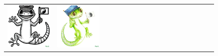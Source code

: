 \begin{figure}[ht!]
\begin{adjustwidth}{-0.8in}{-0.5in}
\begin{tabular}{cccccccccccccccccccc}
\multicolumn{2}{c}{\includegraphics[width=\threebythreecolwidth\textwidth]{figures/cherries/chinese_ink.jpg}} &
\multicolumn{2}{c}{\includegraphics[width=\threebythreecolwidth\textwidth]{figures/cherries/watercolor.jpg}} &

\end{tabular}
\end{adjustwidth}
\end{figure}

